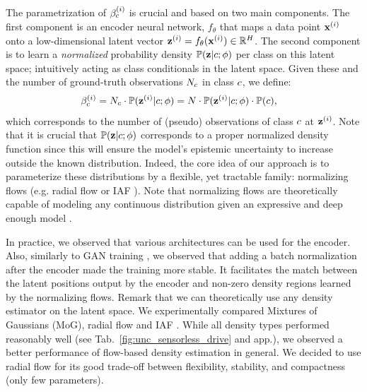 The parametrization of $\beta_c^{(i)}$ is crucial and based on two main components. The first component is an encoder neural network, $f_{\theta}$ that maps a data point $\mathbf{x}^{(i)}$ onto a low-dimensional latent vector $\bold{z}^{(i)}=f_{\theta}(\mathbf{x}^{(i)}) \in \mathbb{R}^{H}$. The second component is to learn a \textit{normalized} probability density $\mathbb{P}(\bold{z} | c; \phi)$ per class on this latent space; intuitively acting as class conditionals in the latent space. Given these and the number of ground-truth observations $N_c$ in class  $c$, we define:
\begin{equation}
\begin{aligned}
\label{eq:additional_observations}
	\beta_c^{(i)} &= N_c \cdot \mathbb{P}(\bold{z}^{(i)} | c; \phi) = N \cdot \mathbb{P}(\bold{z}^{(i)} | c; \phi) \cdot \mathbb{P}(c),
\end{aligned}
\end{equation}
which corresponds to the number of (pseudo) observations of class $c$ at $\bold{z} ^{(i)}$. Note that it is crucial that $\mathbb{P}(\bold{z} | c; \phi)$ corresponds to a proper normalized density function since this will ensure the model's epistemic uncertainty to increase outside the known distribution. Indeed, the core idea of our approach is to parameterize these distributions by a flexible, yet tractable family: normalizing flows (e.g. radial flow \cite{radialflow} or IAF \cite{iaf_flow}). Note that normalizing flows are theoretically capable of modeling any continuous distribution given an expressive and deep enough model \cite{neural_flow, iaf_flow}.

In practice, we observed that various architectures can be used for the encoder. Also, similarly to GAN training \cite{GAN_batch_norm}, we observed that adding a batch normalization after the encoder made the training more stable. It facilitates the match between the latent positions output by the encoder and non-zero density regions learned by the normalizing flows. Remark that we can theoretically use any density estimator on the latent space. We experimentally compared Mixtures of Gaussians (MoG), radial flow \cite{radialflow} and IAF \cite{iaf_flow}. While all density types performed reasonably well (see Tab.~\ref{fig:unc_sensorless_drive} and app.), we observed a better performance of flow-based density estimation in general. We decided to use radial flow for its good trade-off between flexibility, stability, and compactness (only few parameters).

